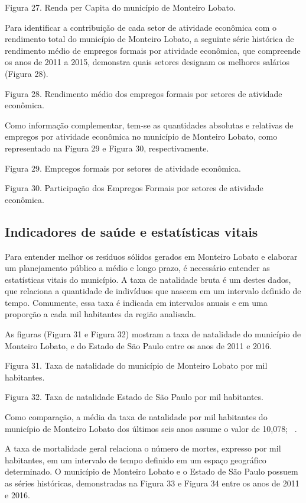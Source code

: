 Figura 27. Renda per Capita do município de Monteiro Lobato.

Para identificar a contribuição de cada setor de atividade econômica com o rendimento total do município de Monteiro Lobato, a seguinte série histórica de rendimento médio de empregos formais por atividade econômica, que compreende os anos de 2011 a 2015, demonstra quais setores designam os melhores salários (Figura 28).
 
Figura 28. Rendimento médio dos empregos formais por setores de atividade econômica.

Como informação complementar, tem-se as quantidades absolutas e relativas de empregos por atividade econômica no município de Monteiro Lobato, como representado na Figura 29 e Figura 30, respectivamente.
 
Figura 29. Empregos formais por setores de atividade econômica.
 
Figura 30. Participação dos Empregos Formais por setores de atividade econômica.

\subsection{Indicadores de saúde e estatísticas vitais}

Para entender melhor os resíduos sólidos gerados em Monteiro Lobato e elaborar um planejamento público a médio e longo prazo, é necessário entender as estatísticas vitais do município. A taxa de natalidade bruta é um destes dados, que relaciona a quantidade de indivíduos que nascem em um intervalo definido de tempo. Comumente, essa taxa é indicada em intervalos anuais e em uma proporção a cada mil habitantes da região analisada. 

As figuras (Figura 31 e Figura 32) mostram a taxa de natalidade do município de Monteiro Lobato, e do Estado de São Paulo entre os anos de 2011 e 2016.
 
Figura 31. Taxa de natalidade do município de Monteiro Lobato por mil habitantes.

Figura 32. Taxa de natalidade Estado de São Paulo por mil habitantes.

Como comparação, a média da taxa de natalidade por mil habitantes do município de Monteiro Lobato dos últimos seis anos assume o valor de 10,078; ~\cite{SEADE2017}.

A taxa de mortalidade geral relaciona o número de mortes, expresso por mil habitantes, em um intervalo de tempo definido em um espaço geográfico determinado. O município de Monteiro Lobato e o Estado de São Paulo possuem as séries históricas, demonstradas na Figura 33 e Figura 34 entre os anos de 2011 e 2016.

